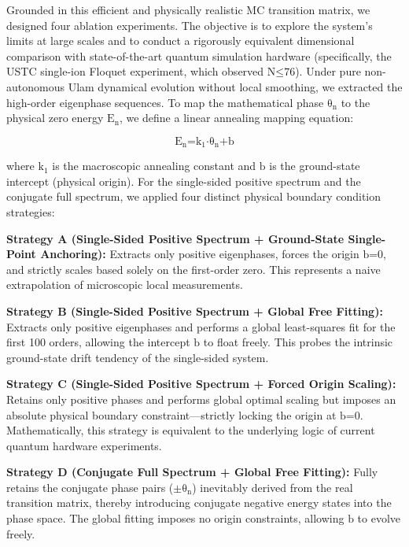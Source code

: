 Grounded in this efficient and physically realistic MC transition
matrix, we designed four ablation experiments. The objective is to
explore the system's limits at large scales and to conduct a rigorously
equivalent dimensional comparison with state-of-the-art quantum
simulation hardware (specifically, the USTC single-ion Floquet
experiment, which observed \(\text{N}\text{≤76}\)). Under pure
non-autonomous Ulam dynamical evolution without local smoothing, we
extracted the high-order eigenphase sequences. To map the mathematical
phase \(\text{θ}_{\text{n}}\) to the physical zero energy
\(\text{E}_{\text{n}}\), we define a linear annealing mapping equation:

\[\text{E}_{\text{n}}\text{=}\text{k}_{\text{1}}\text{⋅}\text{θ}_{\text{n}}\text{+}\text{b}\]

where \(\text{k}_{\text{1}}\) is the macroscopic annealing constant and
\(\text{b}\) is the ground-state intercept (physical origin). For the
single-sided positive spectrum and the conjugate full spectrum, we
applied four distinct physical boundary condition strategies:

\textbf{Strategy A (Single-Sided Positive Spectrum + Ground-State
Single-Point Anchoring):} Extracts only positive eigenphases, forces the
origin \(\text{b}\text{=0}\), and strictly scales based solely on the
first-order zero. This represents a naive extrapolation of microscopic
local measurements.

\textbf{Strategy B (Single-Sided Positive Spectrum + Global Free
Fitting):} Extracts only positive eigenphases and performs a global
least-squares fit for the first 100 orders, allowing the intercept
\(\text{b}\) to float freely. This probes the intrinsic ground-state
drift tendency of the single-sided system.

\textbf{Strategy C (Single-Sided Positive Spectrum + Forced Origin
Scaling):} Retains only positive phases and performs global optimal
scaling but imposes an absolute physical boundary constraint---strictly
locking the origin at \(\text{b}\text{=0}\). Mathematically, this
strategy is equivalent to the underlying logic of current quantum
hardware experiments.

\textbf{Strategy D (Conjugate Full Spectrum + Global Free Fitting):}
Fully retains the conjugate phase pairs
(\(\text{±}\text{θ}_{\text{n}}\)) inevitably derived from the real
transition matrix, thereby introducing conjugate negative energy states
into the phase space. The global fitting imposes no origin constraints,
allowing \(\text{b}\) to evolve freely.

